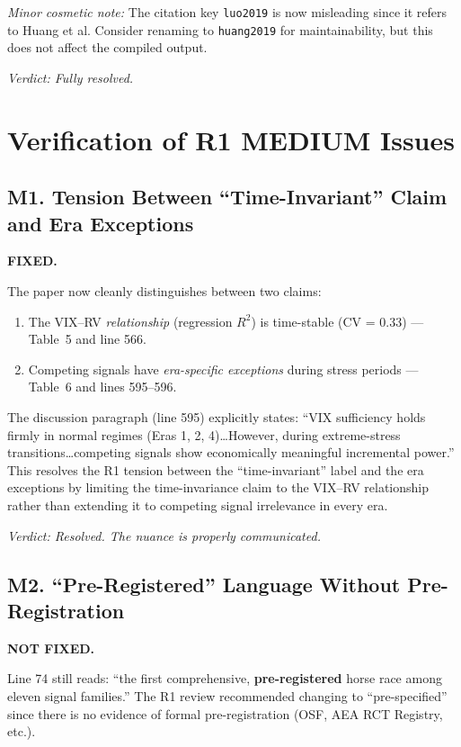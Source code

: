 \documentclass[12pt,a4paper]{article}
\begin{document}
\noindent\textit{Minor cosmetic note:} The citation key \texttt{luo2019} is now misleading since it refers to Huang et al. Consider renaming to \texttt{huang2019} for maintainability, but this does not affect the compiled output.

\noindent\textit{Verdict: Fully resolved.}


\section*{Verification of R1 MEDIUM Issues}

\subsection*{M1. Tension Between ``Time-Invariant'' Claim and Era Exceptions}
\textcolor{fixedblue}{\textbf{FIXED.}}

The paper now cleanly distinguishes between two claims:
\begin{enumerate}
    \item The VIX--RV \emph{relationship} (regression $R^2$) is time-stable (CV = 0.33) --- Table~5 and line 566.
    \item Competing signals have \emph{era-specific exceptions} during stress periods --- Table~6 and lines 595--596.
\end{enumerate}

The discussion paragraph (line 595) explicitly states: ``VIX sufficiency holds firmly in normal regimes (Eras 1, 2, 4)\ldots However, during extreme-stress transitions\ldots competing signals show economically meaningful incremental power.'' This resolves the R1 tension between the ``time-invariant'' label and the era exceptions by limiting the time-invariance claim to the VIX--RV relationship rather than extending it to competing signal irrelevance in every era.

\noindent\textit{Verdict: Resolved. The nuance is properly communicated.}


\subsection*{M2. ``Pre-Registered'' Language Without Pre-Registration}
\textcolor{warncolor}{\textbf{NOT FIXED.}}

Line 74 still reads: ``the first comprehensive, \textbf{pre-registered} horse race among eleven signal families.'' The R1 review recommended changing to ``pre-specified'' since there is no evidence of formal pre-registration (OSF, AEA RCT Registry, etc.).
\end{document}
